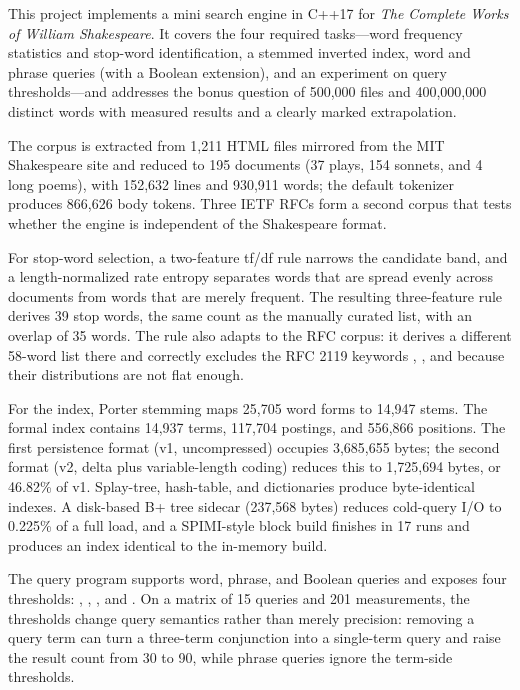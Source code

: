
This project implements a mini search engine in C++17 for \emph{The Complete
Works of William Shakespeare}. It covers the four required tasks---word
frequency statistics and stop-word identification, a stemmed inverted index,
word and phrase queries (with a Boolean extension), and an experiment on query
thresholds---and addresses the bonus question of 500,000 files and 400,000,000
distinct words with measured results and a clearly marked extrapolation.

The corpus is extracted from 1,211 HTML files mirrored from the MIT Shakespeare
site and reduced to 195 documents (37 plays, 154 sonnets, and 4 long poems),
with 152,632 lines and 930,911 words; the default tokenizer produces 866,626
body tokens. Three IETF RFCs form a second corpus that tests whether the engine
is independent of the Shakespeare format.

For stop-word selection, a two-feature tf/df rule narrows the candidate band,
and a length-normalized rate entropy separates words that are spread evenly
across documents from words that are merely frequent. The resulting
three-feature rule derives 39 stop words, the same count as the manually
curated list, with an overlap of 35 words. The rule also adapts to the RFC
corpus: it derives a different 58-word list there and correctly excludes the
RFC 2119 keywords , , and  because their
distributions are not flat enough.

For the index, Porter stemming maps 25,705 word forms to 14,947 stems. The
formal index contains 14,937 terms, 117,704 postings, and 556,866 positions.
The first persistence format (v1, uncompressed) occupies 3,685,655 bytes; the
second format (v2, delta plus variable-length coding) reduces this to
1,725,694 bytes, or 46.82\% of v1. Splay-tree, hash-table, and 
dictionaries produce byte-identical indexes. A disk-based B+ tree sidecar
(237,568 bytes) reduces cold-query I/O to 0.225\% of a full load, and a
SPIMI-style block build finishes in 17 runs and produces an index identical to
the in-memory build.

The query program supports word, phrase, and Boolean queries and exposes four
thresholds: , , , and .
On a matrix of 15 queries and 201 measurements, the thresholds change query
semantics rather than merely precision: removing a query term can turn a
three-term conjunction into a single-term query and raise the result count from
30 to 90, while phrase queries ignore the term-side thresholds.

